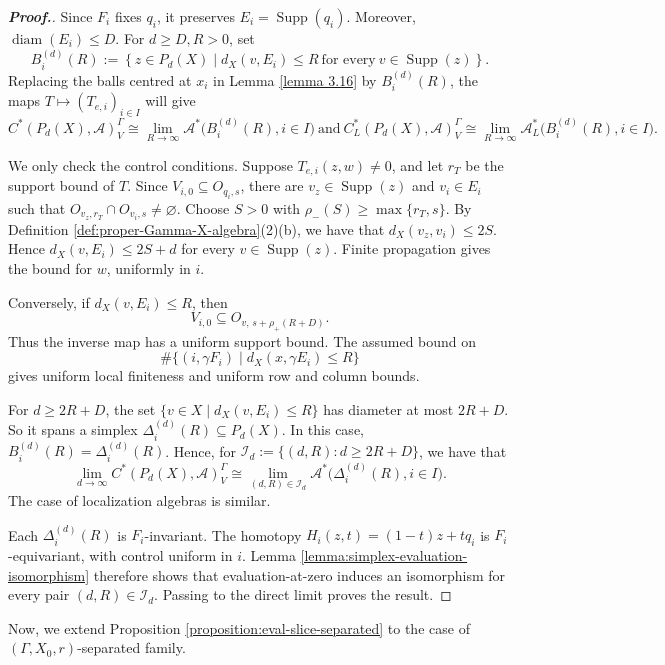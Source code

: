 \documentclass[pdflatex]{sn-jnl}
\theoremstyle{plain}
\theoremstyle{definition}
\begin{document}
\begin{proof}[\textbf{Proof.}]\normalsize
Since $F_i$ fixes $q_i$, it preserves $E_i=\operatorname{Supp}(q_i)$. Moreover,$\operatorname{diam}(E_i)\leq D$. For $d\geq D, R>0$, set
\[B_i^{(d)}(R):=\left\{z\in P_{d}(X)\mid d_X(v,E_i)\leq R
\ \text{for every}\ v\in\operatorname{Supp}(z)\right\}.\]
Replacing the balls centred at $x_i$ in Lemma \ref{lemma 3.16} by $B_i^{(d)}(R)$, the maps $T\mapsto(T_{e,i})_{i\in I}$ will give
\[C^{*}(P_{d}(X),\mathcal{A})^\Gamma_V\cong
\lim_{R\to\infty}\mathcal{A}^*\bigl(B_i^{(d)}(R),i\in I\bigr)\ \text{and}
\ C_L^*(P_{d}(X),\mathcal{A})^\Gamma_V\cong
\lim_{R\to\infty}
\mathcal{A}_L^*\bigl(B_i^{(d)}(R),i\in I\bigr).\]

We only check the control conditions. Suppose $T_{e,i}(z,w)\neq0$, and let $r_T$ be the support bound of $T$. Since
$V_{i,0}\subseteq O_{q_i,s}$, there are 
$v_z\in\operatorname{Supp}(z)$ and $v_i\in E_i$ such that
$O_{v_z,r_T}\cap O_{v_i,s}\neq\varnothing$.
Choose $S>0$ with
$\rho_-(S)\geq\max\{r_T,s\}$. By Definition \ref{def:proper-Gamma-X-algebra}(2)(b), we have that
$d_X(v_z,v_i)\leq2S$. Hence
$d_X(v,E_i)\leq2S+d$ for every
$v\in\operatorname{Supp}(z)$. Finite propagation gives the bound for $w$, uniformly in $i$.

Conversely, if $d_X(v,E_i)\leq R$, then
\[V_{i,0}\subseteq O_{v,\,s+\rho_+(R+D)}.\]
Thus the inverse map has a uniform support bound. The assumed bound on
\[\#\{(i,\gamma F_i)\mid d_X(x,\gamma E_i)\leq R\}\]
gives uniform local finiteness and uniform row and column bounds. 

For $d\geq2R+D$, the set
$\{v\in X\mid d_X(v,E_i)\leq R\}$ has diameter at most $2R+D$. So it spans a simplex
$\Delta_i^{(d)}(R)\subseteq P_{d}(X)$. In this case,
$B_i^{(d)}(R)=\Delta_i^{(d)}(R)$. Hence, for
$\mathcal I_{d}:=\{(d,R):d\geq2R+D\}$, we have that
\[\lim_{d\to\infty}C^*(P_{d}(X),\mathcal{A})^\Gamma_V
\cong\lim_{(d,R)\in\mathcal I_{d}}
\mathcal{A}^*\bigl(\Delta_i^{(d)}(R),i\in I\bigr).
\]The case of localization algebras is similar.

Each $\Delta_i^{(d)}(R)$ is $F_i$-invariant. The homotopy
$H_i(z,t)=(1-t)z+tq_i$ is $F_i$-equivariant, with control uniform in $i$. Lemma \ref{lemma:simplex-evaluation-isomorphism} therefore shows that evaluation-at-zero induces an isomorphism for every pair $(d,R)\in\mathcal I_{d}$. Passing to the direct limit proves the result.
\end{proof}
Now, we extend Proposition \ref{proposition:eval-slice-separated} to the case of 
$(\Gamma, X_0, r)$-separated family.
\end{document}
